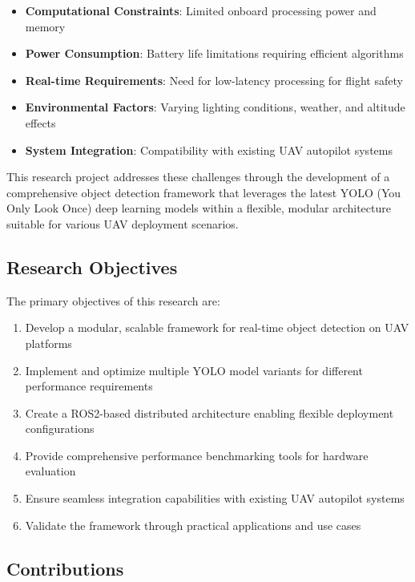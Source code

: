\documentclass[11pt,a4paper]{article}
\begin{document}
\begin{itemize}[itemsep=0.5em]
    \item \textbf{Computational Constraints}: Limited onboard processing power and memory
    \item \textbf{Power Consumption}: Battery life limitations requiring efficient algorithms
    \item \textbf{Real-time Requirements}: Need for low-latency processing for flight safety
    \item \textbf{Environmental Factors}: Varying lighting conditions, weather, and altitude effects
    \item \textbf{System Integration}: Compatibility with existing UAV autopilot systems
\end{itemize}

This research project addresses these challenges through the development of a comprehensive object detection framework that leverages the latest YOLO (You Only Look Once) deep learning models within a flexible, modular architecture suitable for various UAV deployment scenarios.

\subsection{Research Objectives}

The primary objectives of this research are:

\begin{enumerate}[itemsep=0.5em]
    \item Develop a modular, scalable framework for real-time object detection on UAV platforms
    \item Implement and optimize multiple YOLO model variants for different performance requirements
    \item Create a ROS2-based distributed architecture enabling flexible deployment configurations
    \item Provide comprehensive performance benchmarking tools for hardware evaluation
    \item Ensure seamless integration capabilities with existing UAV autopilot systems
    \item Validate the framework through practical applications and use cases
\end{enumerate}

\subsection{Contributions}
\end{document}
